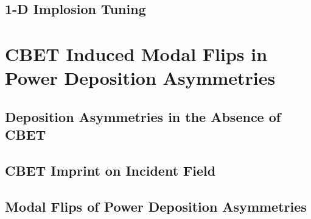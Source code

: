 \subsection{1-D Implosion Tuning}%
\label{sec:Res1_1D_tuning}


\section{CBET Induced Modal Flips in Power Deposition Asymmetries}%
\label{sec:Res1_PdepR_CBET_asymm}


\subsection{Deposition Asymmetries in the Absence of CBET}%
\label{sec:Res1_noCBET_asymmetries}


\subsection{CBET Imprint on Incident Field}%
\label{sec:Res1_CBET_imprint}


\subsection{Modal Flips of Power Deposition Asymmetries}%
\label{sec:Res1_ModalFlip}


